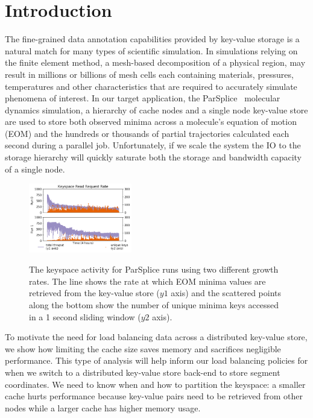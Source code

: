 \section{Introduction}
\label{sec:introduction}

The fine-grained data annotation capabilities provided by key-value storage is
a natural match for many types of scientific simulation. In simulations relying
on the finite element method, a mesh-based decomposition of a physical region,
may result in millions or billions of mesh cells each containing materials,
pressures, temperatures and other characteristics that are required to
accurately simulate phenomena of interest. In our target application, the
ParSplice~\cite{perez:jctc20150parsplice} molecular dynamics simulation, a
hierarchy of cache nodes and a single node key-value store are used to store
both observed minima across a molecule's equation of motion (EOM) and the
hundreds or thousands of partial trajectories calculated each second during a
parallel job. Unfortunately, if we scale the system the IO to the storage
hierarchy will quickly saturate both the storage and bandwidth capacity of a
single node. 

\begin{figure}[t]
  \noindent\includegraphics[width=0.4\textwidth]{figures/motivation-regimes.png}\\
  \caption{The keyspace activity for ParSplice runs using two different growth
  rates.  The line shows the rate at which EOM minima values are retrieved
  from the key-value store (\(y1\) axis) and the scattered points along the
  bottom show the number of unique minima keys accessed in a 1 second sliding
  window (\(y2\) axis).  \label{fig:motivation-regimes}}
\end{figure}


To motivate the need for load balancing data across a distributed key-value store,
we show how limiting the cache size saves memory and sacrifices negligible
performance. This type of analysis will help inform our load balancing policies
for when we switch to a distributed key-value store back-end to store segment
coordinates.  We need to know when and how to partition the keyspace: a smaller
cache hurts performance because key-value pairs need to be retrieved from other
nodes while a larger cache has higher memory usage. 

